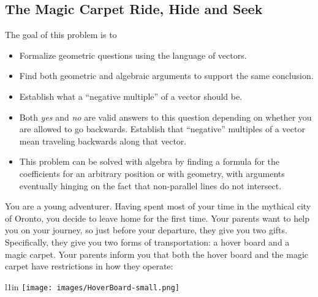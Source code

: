 \begin{iola}
\section*{The Magic Carpet Ride, Hide and Seek}
\question

\begin{annotation}
	\begin{goals}

		The goal of this problem is to
		\begin{itemize}
			\item Formalize geometric questions using the language of vectors.
			\item Find both geometric and algebraic arguments to support the same
				conclusion.
			\item Establish what a ``negative multiple'' of a vector should be.
		\end{itemize}
	\end{goals}
	\begin{notes}
		\begin{itemize}
			\item Both \emph{yes} and \emph{no} are valid answers to
				this question depending on whether you are allowed
				to go backwards. Establish that ``negative'' multiples of
				a vector mean traveling backwards along that vector.
			\item This problem can be solved with algebra by finding a formula
				for the coefficients for an arbitrary position or with geometry,
				with arguments eventually hinging on the fact that non-parallel
				lines do not intersect.
		\end{itemize}
	\end{notes}
\end{annotation}
You are a young adventurer. Having spent most of your time in the mythical city of Oronto,
	you decide to leave home for the first time. Your parents
want to help you on your journey, so just before your departure, they give
you two gifts. Specifically, they give you two forms of transportation:
a hover board and a magic carpet. Your parents inform you that both the
hover board and the magic carpet have restrictions in how they operate:



\begin{minipage}{\textwidth}
	\vspace{.5cm}
	\begin{wrapfigure}{l}{1in}
	\vspace{-.8cm}
	\texttt{[image: images/HoverBoard-small.png]}
	\end{wrapfigure}


\end{minipage}
\end{iola}
